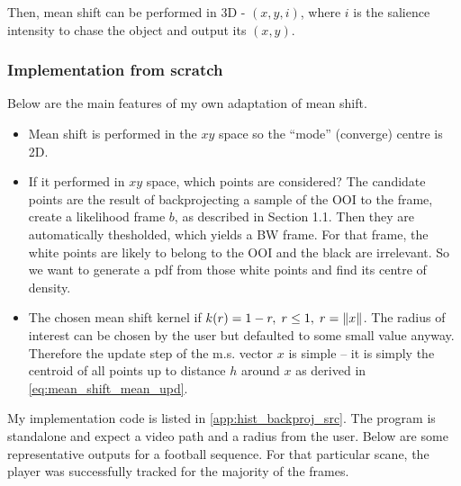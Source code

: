 \documentclass[a4paper]{article}
\begin{document}
Then, mean shift can be performed in 3D - $(x,y,i)$, where $i$ is the salience intensity to chase the object and output its $(x,y)$.


\subsubsection{Implementation from scratch}

Below are the main features of my own adaptation of mean shift.
\begin{itemize}
    \item Mean shift is performed in the $xy$ space so the ``mode'' (converge) centre is 2D.
    \item If it performed in $xy$ space, which points are considered? The candidate points are the result of backprojecting a sample of the OOI to the frame, create a likelihood frame $b$, as described in Section 1.1. Then they are automatically thesholded, which yields a BW frame. For that frame, the white points are likely to belong to the OOI and the black are irrelevant. So we want to generate a pdf from those white points and find its centre of density.
    \item The chosen mean shift kernel if $k(r) = 1 - r, \; r \leq 1, \; r = \left\lVert x\right\rVert$. The radius of interest can be chosen by the user but defaulted to some small value anyway. Therefore the update step of the m.s. vector $x$ is simple -- it is simply the centroid of all points up to distance $h$ around $x$ as derived in \ref{eq:mean_shift_mean_upd}.
\end{itemize}
My implementation code is listed in \ref{app:hist_backproj_src}. The program is standalone and expect a video path and a radius from the user. Below are some representative outputs for a football sequence. For that particular scane, the player was successfully tracked for the majority of the frames.
\end{document}
